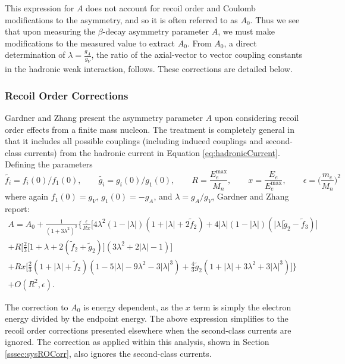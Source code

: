 This expression for $A$ does not account for recoil order and Coulomb modifications to the asymmetry, and so it is
often referred to as $A_0$. Thus we see that upon measuring the $\beta$-decay
asymmetry parameter $A$, we must make modifications to the measured value to extract
$A_0$. From $A_0$, a direct determination of $\lambda = \frac{g_A}{g_V}$, the ratio of the axial-vector to vector
coupling constants in the hadronic weak interaction, follows.
These corrections are detailed below.

\subsubsection{Recoil Order Corrections}  \label{sssec:ROCorr}

Gardner and Zhang \cite{gardner2001} present the asymmetry parameter $A$ upon considering recoil order effects
from a finite mass nucleon. The treatment is completely general in that it includes all possible couplings
(including induced couplings and second-class currents) from the hadronic current in Equation
\ref{eq:hadronicCurrent}. Defining the parameters
%
\begin{equation*}
  \tilde{f_i}=f_i(0)/f_1(0),\qquad  \tilde{g_i}=g_i(0)/g_1(0), \qquad
  R=\frac{E^{\mathrm{max}}_e}{M_n}, \qquad x = \frac{E_e}{E^{\mathrm{max}}_e}, \qquad \epsilon=\Big(\frac{m_e}{M_n}\Big)^2
\end{equation*}
where again $f_1(0)=g_V$, $g_1(0)=-g_A$, and $\lambda=g_A/g_V$, Gardner and Zhang report:
%
\begin{multline}
  A = A_0 + \frac{1}{(1+3\lambda^2)^2}\Bigg\{\frac{\epsilon}{Rx}\Big[4\lambda^2
      (1-|\lambda|)(1+|\lambda|+2\tilde{f}_2)+4|\lambda|(1-|\lambda|)
      (|\lambda|\tilde{g}_2-\tilde{f}_3)\Big] \\
    + R\bigg[\frac{2}{3}\big[1+\lambda+2(\tilde{f}_2+\tilde{g}_2)\big]
      (3\lambda^2+2|\lambda|-1)\bigg] \\
      +Rx\bigg[\frac{2}{3}(1+|\lambda| + \tilde{f}_2)
        (1-5|\lambda|-9\lambda^2-3|\lambda|^3)
        +\frac{4}{3}\tilde{g}_2(1+|\lambda|+3\lambda^2+3|\lambda|^3)\bigg]\Bigg\} \\
  +O(R^2,\epsilon).
\end{multline}

The correction to $A_0$ is energy dependent, as the $x$ term is simply the electron energy divided by
the endpoint energy. The above expression simplifies to the recoil order corrections
presented elsewhere \cite{bilenkii1960,wilkinson1982} when the second-class currents
are ignored. The correction as applied within this analysis, shown in Section \ref{sssec:sysROCorr},
also ignores the second-class currents.

